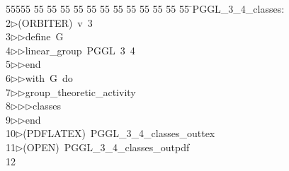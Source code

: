 %
%
\begin{tabbing}
55555 \= 55 \= 55 \= 55 \= 55 \= 55 \= 55 \= 55 \= 55 \= 55 \= 55 \= 55 \= 55 \= \>PGGL\_3\_4\_classes:\\[0pt]
2\>$\triangleright$\>(ORBITER)\ v\ 3\ \\[0pt]
3\>$\triangleright$\>$\triangleright$\>define\ G\ \\[0pt]
4\>$\triangleright$\>$\triangleright$\>linear\_group\ PGGL\ 3\ 4\ \\[0pt]
5\>$\triangleright$\>$\triangleright$\>end\ \\[0pt]
6\>$\triangleright$\>$\triangleright$\>with\ G\ do\ \\[0pt]
7\>$\triangleright$\>$\triangleright$\>group\_theoretic\_activity\ \\[0pt]
8\>$\triangleright$\>$\triangleright$\>$\triangleright$\>classes\ \\[0pt]
9\>$\triangleright$\>$\triangleright$\>end\\[0pt]
10\>$\triangleright$\>(PDFLATEX)\ PGGL\_3\_4\_classes\_outtex\\[0pt]
11\>$\triangleright$\>(OPEN)\ PGGL\_3\_4\_classes\_outpdf\\[0pt]
12\>\end{tabbing}
